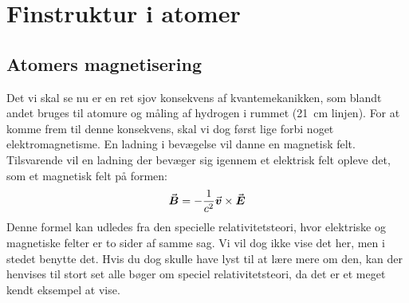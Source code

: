 \documentclass[../../Atom-ogMolekylefysik.tex]{subfiles}
\begin{document}
\section{Finstruktur i atomer}
\subsection{Atomers magnetisering}
Det vi skal se nu er en ret sjov konsekvens af kvantemekanikken, som blandt andet bruges til atomure og måling af hydrogen i rummet (\SI{21}{\centi\metre} linjen). For at komme frem til denne konsekvens, skal vi dog først lige forbi noget elektromagnetisme. En ladning i bevægelse vil danne en magnetisk felt. Tilsvarende vil en ladning der bevæger sig igennem et elektrisk felt opleve det, som et magnetisk felt på formen:
\begin{equation}
    {\vec{\boldsymbol{B}}}=-\frac{1}{c^2}{\vec{\boldsymbol{v}}}\times{\vec{\boldsymbol{E}}}
\end{equation}
Denne formel kan udledes fra den specielle relativitetsteori, hvor elektriske og magnetiske felter er to sider af samme sag. Vi vil dog ikke vise det her, men i stedet benytte det. Hvis du dog skulle have lyst til at lære mere om den, kan der henvises til stort set alle bøger om speciel relativitetsteori, da det er et meget kendt eksempel at vise.
\end{document}
